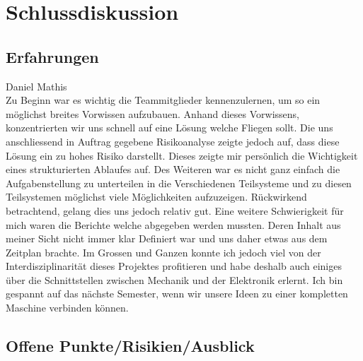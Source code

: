 \section{Schlussdiskussion}

\subsection{Erfahrungen}

Daniel Mathis\\
Zu Beginn war es wichtig die Teammitglieder kennenzulernen, um so ein möglichst breites Vorwissen aufzubauen. Anhand dieses Vorwissens, konzentrierten wir uns schnell auf eine Lösung welche Fliegen sollt. Die uns anschliessend in Auftrag gegebene Risikoanalyse zeigte jedoch auf, dass diese Lösung ein zu hohes Risiko darstellt. Dieses zeigte mir persönlich die Wichtigkeit eines strukturierten Ablaufes auf. Des Weiteren war es nicht ganz einfach die Aufgabenstellung zu unterteilen in die Verschiedenen Teilsysteme und zu diesen Teilsystemen möglichst viele Möglichkeiten aufzuzeigen. Rückwirkend betrachtend, gelang dies uns jedoch relativ gut. Eine weitere Schwierigkeit für mich waren die Berichte welche abgegeben werden mussten. Deren Inhalt aus meiner Sicht nicht immer klar Definiert war und uns daher etwas aus dem Zeitplan brachte. Im Grossen und Ganzen konnte ich jedoch viel von der Interdisziplinarität dieses Projektes profitieren und habe deshalb auch einiges über die Schnittstellen zwischen Mechanik und der Elektronik erlernt. Ich bin gespannt auf das nächste Semester, wenn wir unsere Ideen zu einer kompletten Maschine verbinden können.


\subsection{Offene Punkte/Risikien/Ausblick}